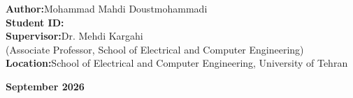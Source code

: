 \begin{latin}
\begin{titlepage}
\begin{center}
    \vspace{2cm}

    \begin{minipage}{0.85\textwidth}
        \large
        \textbf{Author:}\quad Mohammad Mahdi Doustmohammadi\\[0.3cm]
        \textbf{Student ID:}\\[0.6cm]
        \textbf{Supervisor:}\quad Dr. Mehdi Kargahi\\[0.2cm]
        \small (Associate Professor, School of Electrical and Computer Engineering)\\[0.6cm]
        \textbf{Location:}\quad School of Electrical and Computer Engineering, University of Tehran
    \end{minipage}

    \vfill

    {\large\bfseries September 2026}

\end{center}
\end{titlepage}
\end{latin}
